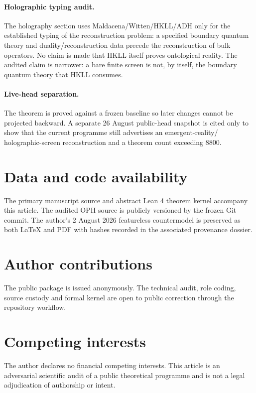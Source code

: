 \documentclass[10pt,a4paper]{article}
\theoremstyle{definition}
\theoremstyle{remark}
\begin{document}
\paragraph{Holographic typing audit.}
The holography section uses Maldacena/Witten/HKLL/ADH only for the established
typing of the reconstruction problem: a specified boundary quantum theory and
duality/reconstruction data precede the reconstruction of bulk operators.  No
claim is made that HKLL itself proves ontological reality.  The audited claim
is narrower: a bare finite screen is not, by itself, the boundary quantum
theory that HKLL consumes.

\paragraph{Live-head separation.}
The theorem is proved against a frozen baseline so later changes cannot be
projected backward.  A separate 26 August public-head snapshot is cited only
to show that the current programme still advertises an emergent-reality/
holographic-screen reconstruction and a theorem count exceeding 8800.

\section*{Data and code availability}

The primary manuscript source and abstract Lean 4 theorem kernel accompany
this article.  The audited OPH source is publicly versioned by the frozen Git
commit.  The author's 2 August 2026 featureless countermodel is preserved as
both LaTeX and PDF with hashes recorded in the associated provenance dossier.

\section*{Author contributions}
The public package is issued anonymously.  The technical audit, role coding,
source custody and formal kernel are open to public correction through the
repository workflow.

\section*{Competing interests}

The author declares no financial competing interests.  This article is an
adversarial scientific audit of a public theoretical programme and is not a
legal adjudication of authorship or intent.
\end{document}
